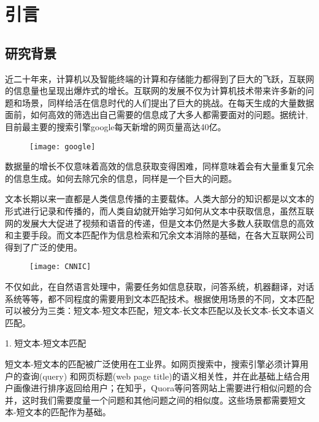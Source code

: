 
\chapter{引言}
\label{chap:introduction}

\section{研究背景}
近二十年来，计算机以及智能终端的计算和存储能力都得到了巨大的飞跃，互联网的信息量也呈现出爆炸式的增长。互联网的发展不仅为计算机技术带来许多新的问题和场景，同样给活在信息时代的人们提出了巨大的挑战。在每天生成的大量数据面前，如何高效的筛选出自己需要的信息成了大多人都需要面对的问题。据统计\citep{website:WWW},目前最主要的搜索引擎google每天新增的网页量高达40亿。

\begin{figure}[!htbp]
    \centering
    \texttt{[image: google]}
    \label{fig:user-ad-match}
\end{figure}

数据量的增长不仅意味着高效的信息获取变得困难，同样意味着会有大量重复冗余的信息生成。如何去除冗余的信息，同样是一个巨大的问题。

文本长期以来一直都是人类信息传播的主要载体。人类大部分的知识都是以文本的形式进行记录和传播的，而人类自幼就开始学习如何从文本中获取信息，虽然互联网的发展大大促进了视频和语音的传递，但是文本仍然是大多数人获取信息的高效和主要手段。而文本匹配作为信息检索和冗余文本消除的基础，在各大互联网公司得到了广泛的使用。

\begin{figure}[!htbp]
    \centering
    \texttt{[image: CNNIC]}
    \label{fig:CNNIC}
\end{figure}

不仅如此，在自然语言处理中，需要任务如信息获取，问答系统，机器翻译，对话系统等等，都不同程度的需要用到文本匹配技术。根据使用场景的不同，文本匹配可以被分为三类：短文本-短文本匹配，短文本-长文本匹配以及长文本-长文本语义匹配。

1. 短文本-短文本匹配

短文本-短文本的匹配被广泛使用在工业界。如网页搜索中，搜索引擎必须计算用户的查询(query) 和网页标题(web page title)的语义相关性，并在此基础上结合用户画像进行排序返回给用户；在知乎，Quora等问答网站上需要进行相似问题的合并，这时我们需要度量一个问题和其他问题之间的相似度。这些场景都需要短文本-短文本的匹配作为基础。

